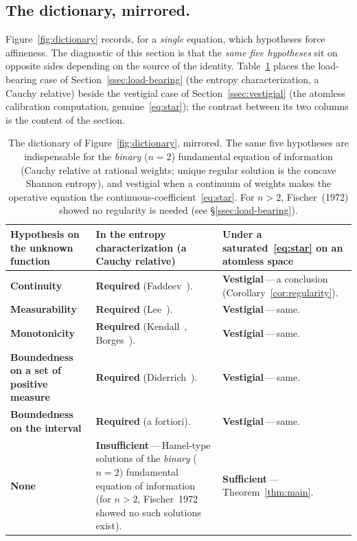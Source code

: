 \documentclass{article}
\theoremstyle{plain}
\theoremstyle{definition}
\begin{document}
\subsection{The dictionary, mirrored.}
\label{ssec:mirror}

Figure~\ref{fig:dictionary} records, for a \emph{single} equation,
which hypotheses force affineness. The diagnostic of this section is
that the \emph{same five hypotheses} sit on opposite sides depending
on the source of the identity. Table~\ref{tab:mirror} places the
load-bearing case of Section~\ref{ssec:load-bearing} (the entropy
characterization, a Cauchy relative) beside the vestigial case of
Section~\ref{ssec:vestigial} (the atomless calibration computation,
genuine~\eqref{eq:star}); the contrast between its two columns is
the content of the section.

\begin{table}[ht]
\renewcommand{\arraystretch}{1.4}
\centering
\begin{tabularx}{\linewidth}{@{} >{\raggedright\arraybackslash}X
  >{\raggedright\arraybackslash}X
  >{\raggedright\arraybackslash}X @{}}
\toprule
\textbf{Hypothesis on the unknown function} &
\textbf{In the entropy characterization (a Cauchy relative)} &
\textbf{Under a saturated~\eqref{eq:star} on an atomless space} \\
\midrule
\textbf{Continuity}
  & \textbf{Required} (Faddeev~\cite{Faddeev1957}).
  & \textbf{Vestigial}\,---\,a conclusion (Corollary~\ref{cor:regularity}). \\
\midrule
\textbf{Measurability}
  & \textbf{Required} (Lee~\cite{Lee1964}).
  & \textbf{Vestigial}\,---\,same. \\
\midrule
\textbf{Monotonicity}
  & \textbf{Required} (Kendall~\cite{Kendall1964}, Borges~\cite{Borges1967}).
  & \textbf{Vestigial}\,---\,same. \\
\midrule
\textbf{Boundedness on a set of positive measure}
  & \textbf{Required} (Diderrich~\cite{Diderrich1975}).
  & \textbf{Vestigial}\,---\,same. \\
\midrule
\textbf{Boundedness on the interval}
  & \textbf{Required} (a fortiori).
  & \textbf{Vestigial}\,---\,same. \\
\midrule
\textbf{None}
  & \textbf{Insufficient}\,---\,Hamel-type solutions of the \emph{binary} ($n{=}2$) fundamental equation of information~\cite{AczelDaroczy1975} (for $n{>}2$, Fischer~1972 showed no such solutions exist).
  & \textbf{Sufficient}\,---\,Theorem~\ref{thm:main}. \\
\bottomrule
\end{tabularx}
\caption{The dictionary of Figure~\ref{fig:dictionary}, mirrored. The
same five hypotheses are indispensable for the \emph{binary} ($n{=}2$)
fundamental equation of information (Cauchy relative at rational weights;
unique regular solution is the concave Shannon entropy), and vestigial
when a continuum of weights makes the operative equation the
continuous-coefficient~\eqref{eq:star}. For $n{>}2$, Fischer~(1972)
showed no regularity is needed (see \S\ref{ssec:load-bearing}).}
\label{tab:mirror}
\end{table}
\end{document}
